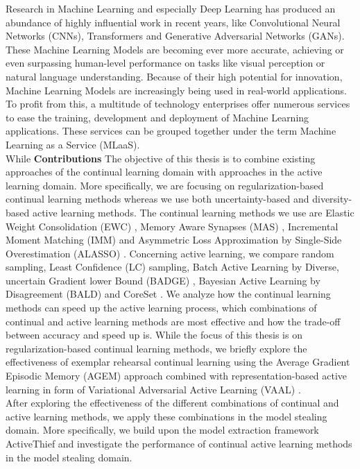 Research in Machine Learning and especially Deep Learning has produced an abundance of highly influential work in recent years, like
Convolutional Neural Networks (CNNs), Transformers and Generative Adversarial Networks (GANs). These Machine Learning Models are
becoming ever more accurate, achieving or even surpassing human-level performance on tasks like visual perception or natural language
understanding. Because of their high potential for innovation, Machine Learning Models are increasingly being used in real-world 
applications. To profit from this, a multitude of technology enterprises offer numerous services to ease the training, development and
deployment of Machine Learning applications. These services can be grouped together under the term Machine Learning as a Service (MLaaS). \\
While 
\textbf{Contributions} \hspace{0.2cm} The objective of this thesis is to combine existing approaches of the continual learning domain
 with approaches in the active learning domain. More specifically, we are focusing on regularization-based continual learning methods
whereas we use both uncertainty-based and diversity-based active learning methods. The continual learning methods we use are Elastic
Weight Consolidation (EWC) \cite{kirkpatrick2017overcoming}, Memory Aware Synapses (MAS) \cite{aljundi2018memory}, Incremental Moment Matching
(IMM) \cite{lee2017overcoming} and Asymmetric Loss Approximation by Single-Side Overestimation (ALASSO) \cite{park2019continual}.
Concerning active learning, we compare random sampling, Least Confidence (LC) \cite{lewis1994sequential} sampling, Batch Active Learning by
Diverse, uncertain Gradient lower Bound (BADGE) \cite{ash2019deep}, Bayesian Active Learning by Disagreement (BALD) \cite{houlsby2011bayesian} and
CoreSet \cite{sener2017active}.
We analyze how the continual learning methods can speed up the active learning process, which combinations of continual and active learning methods
are most effective and how the trade-off between accuracy and speed up is. While the focus of this thesis is on regularization-based continual
learning methods, we briefly explore the effectiveness of exemplar rehearsal continual learning using the Average Gradient Episodic Memory (AGEM)
approach \cite{chaudhry2018efficient} combined with representation-based active learning in form of Variational Adversarial Active Learning (VAAL)
\cite{sinha2019variational}. \\
After exploring the effectiveness of the different combinations of continual and active learning methods, we apply these combinations in the model stealing
domain. More specifically, we build upon the model extraction framework ActiveThief \cite{pal2020activethief} and investigate the performance of continual
active learning methods in the model stealing domain.
